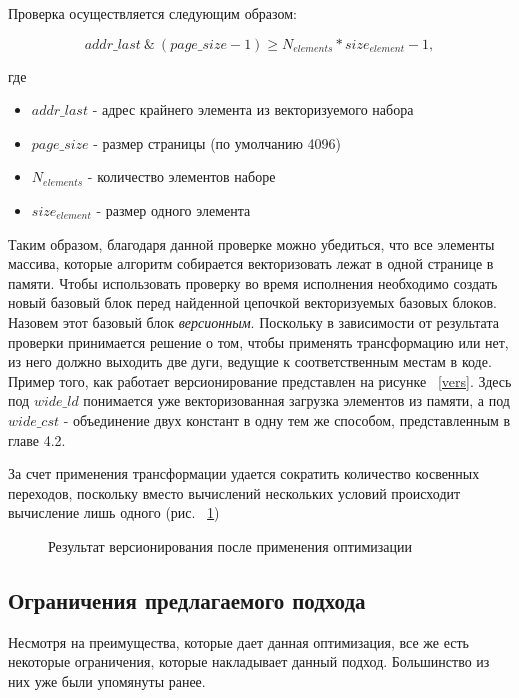 Проверка осуществляется следующим образом:

\begin{equation}
    addr\_last \ \& \ (page\_size - 1) \ge N_{elements} * size_{element} - 1,
\end{equation}

где 

\begin{itemize}
    \item $addr\_last$ - адрес крайнего элемента из векторизуемого набора
    \item $page\_size$ - размер страницы (по умолчанию 4096)
    \item $N_{elements}$ - количество элементов наборе
    \item $size_{element}$ - размер одного элемента
\end{itemize}

Таким образом, благодаря данной проверке можно убедиться, что все элементы массива, которые алгоритм собирается векторизовать лежат в одной странице в памяти. Чтобы использовать проверку во время исполнения необходимо создать новый базовый блок перед найденной цепочкой векторизуемых базовых блоков. Назовем этот базовый блок \textit{версионным}. Поскольку в зависимости от результата проверки принимается решение о том, чтобы применять трансформацию или нет, из него должно выходить две дуги, ведущие к соответственным местам в коде. Пример того, как работает версионирование представлен на рисунке ~\ref{vers}. Здесь под $wide\_ld$ понимается уже векторизованная загрузка элементов из памяти, а под $wide\_cst$ - объединение двух констант в одну тем же способом, представленным в главе 4.2.


За счет применения трансформации удается сократить количество косвенных переходов, поскольку вместо вычислений нескольких условий происходит вычисление лишь одного (рис. ~\ref{spec})

\begin{figure}[!htb]
    \centering
    
    \caption{Результат версионирования после применения оптимизации}
    \label{spec}
\end{figure}

\subsection{Ограничения предлагаемого подхода}

Несмотря на преимущества, которые дает данная оптимизация, все же есть некоторые ограничения, которые накладывает данный подход. Большинство из них уже были упомянуты ранее.

